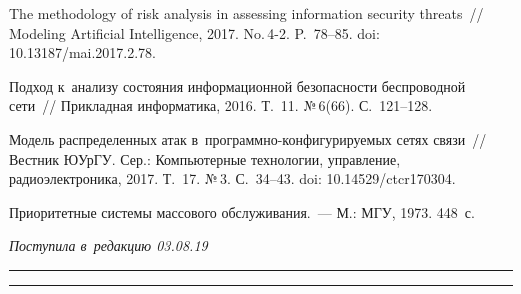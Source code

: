 \begin{multicols}{2}
{{\begin{thebibliography}{9}
   The methodology of 
risk analysis in assessing information security threats~// Modeling Artificial Intelligence, 2017. 
No.\,4-2. P.~78--85. doi: 10.13187/mai.2017.2.78.

  
   Подход к~анализу состояния информационной безопасности 
беспроводной сети~// Прикладная информатика, 2016. Т.~11. №\,6(66). С.~121--128.

   Модель распределенных атак 
  в~программно-конфигурируемых сетях связи~// Вестник ЮУрГУ. Сер.: Компьютерные технологии, 
управление, радиоэлектроника, 2017. Т.~17. №\,3. С.~34--43. doi: 10.14529/ctcr170304.

Приоритетные системы массового обслуживания.~--- М.: МГУ, 1973. 448~с.
 \end{thebibliography}

 }
 }

\end{multicols}

\vspace*{-3pt}

\hfill{\small\textit{Поступила в~редакцию 03.08.19}}

\vspace*{8pt}




\hrule

\vspace*{2pt}

\hrule


\def\tit{MODELING OF~MONITORING OF~INFORMATION SECURITY 
PROCESS ON~THE~BASIS OF~QUEUING SYSTEMS}


\def\titkol{Modeling of~monitoring of~information security 
process on~the~basis of~queuing systems}

\def\aut{G.\,A.~Popov$^1$, S.\,Zh.~Simavoryan$^2$, A.\,R.~Simonyan$^2$, 
and~E.\,I.~Ulitina$^2$}

\def\autkol{G.\,A.~Popov, S.\,Zh.~Simavoryan, A.\,R.~Simonyan, 
and~E.\,I.~Ulitina}

